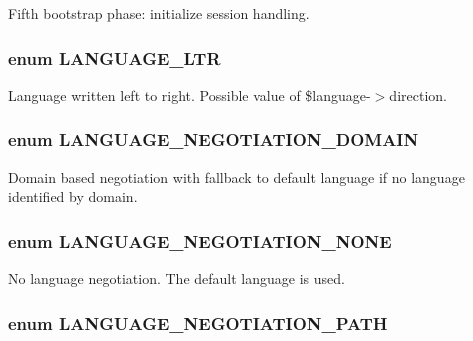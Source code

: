 Fifth bootstrap phase: initialize session handling. \hypertarget{bootstrap_8inc_8790965df4de009fe8bdcf17f6a5c738}{
\subsubsection[{LANGUAGE\_\-LTR}]{\setlength{\rightskip}{0pt plus 5cm}enum {\bf LANGUAGE\_\-LTR}}}
\label{bootstrap_8inc_8790965df4de009fe8bdcf17f6a5c738}


Language written left to right. Possible value of \$language-$>$direction. \hypertarget{bootstrap_8inc_4364d1b8742532db73639f34457529ef}{
\subsubsection[{LANGUAGE\_\-NEGOTIATION\_\-DOMAIN}]{\setlength{\rightskip}{0pt plus 5cm}enum {\bf LANGUAGE\_\-NEGOTIATION\_\-DOMAIN}}}
\label{bootstrap_8inc_4364d1b8742532db73639f34457529ef}


Domain based negotiation with fallback to default language if no language identified by domain. \hypertarget{bootstrap_8inc_ea1c293260404804b9cd8317f9559e70}{
\subsubsection[{LANGUAGE\_\-NEGOTIATION\_\-NONE}]{\setlength{\rightskip}{0pt plus 5cm}enum {\bf LANGUAGE\_\-NEGOTIATION\_\-NONE}}}
\label{bootstrap_8inc_ea1c293260404804b9cd8317f9559e70}


No language negotiation. The default language is used. \hypertarget{bootstrap_8inc_5a3d6548cae60a6c58cb7673b31abfeb}{
\subsubsection[{LANGUAGE\_\-NEGOTIATION\_\-PATH}]{\setlength{\rightskip}{0pt plus 5cm}enum {\bf LANGUAGE\_\-NEGOTIATION\_\-PATH}}}
\label{bootstrap_8inc_5a3d6548cae60a6c58cb7673b31abfeb}



